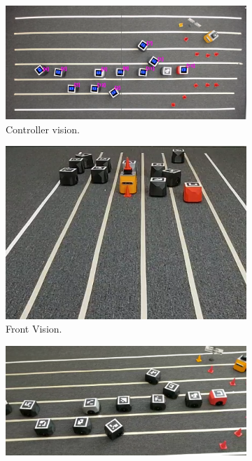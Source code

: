 \begin{appendix}

\begin{figure}[H]
\centering
\begin{subfigure}[t]{\textwidth}
    \includegraphics[width=\textwidth]{Anexos/red_lane/red_lane_it10_cam0.png}
    \caption{Controller vision.}
    \label{fig:first}
\end{subfigure}
\vspace{1cm}
\begin{subfigure}[b]{0.4\textwidth}
    \includegraphics[width=\textwidth]{Anexos/obs_avoid/obs_avoid_it10_cam1.png}
    \caption{Front Vision.}
    \label{fig:second}
\end{subfigure}
\hfill
\begin{subfigure}[b]{0.50\textwidth}
    \includegraphics[width=\textwidth]{Anexos/red_lane/red_lane_it10_cam2.png}

\end{subfigure}
\end{figure}
\end{appendix}
